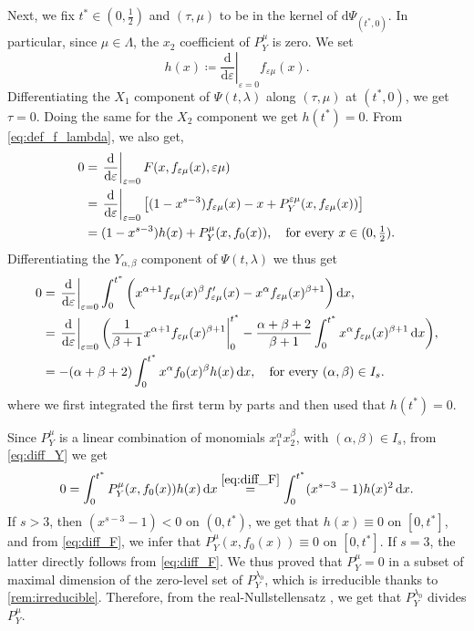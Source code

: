 \documentclass[a4paper,11pt,reqno]{amsart}
\theoremstyle{plain}
\theoremstyle{definition}
\newcommand{\de}{\mathrm{d}}
\begin{document}
Next, we fix $t^* \in (0,\tfrac{1}{2})$ and $(\tau,\mu)$ to be in the kernel of $\de\Psi_{(t^*,0)}$. In particular, since $\mu \in \Lambda$, the $x_2$ coefficient of $P^\mu_Y$ is zero. We set
\begin{equation*}
    h(x) \coloneq  \left.\frac{\de}{\de\varepsilon}\right|_{\varepsilon=0}
 f_{\varepsilon \mu}(x).
\end{equation*}
Differentiating the $X_1$ component of $\Psi(t,\lambda)$ along $(\tau,\mu)$ at $(t^*,0)$, we get $\tau=0$. Doing the same for the $X_2$ component we get $h(t^*)=0$. From \eqref{eq:def_f_lambda}, we also get,
\begin{align}
    0 &= \left.\frac{\de}{\de\varepsilon}\right|_{\varepsilon=0} F(x,f_{\varepsilon\mu}(x),\varepsilon\mu) \notag \\ 
    &= \left.\frac{\de}{\de\varepsilon}\right|_{\varepsilon=0} \left[(1-x^{s-3})f_{\varepsilon\mu}(x) -x + P^{\varepsilon\mu}_Y(x,f_{\varepsilon\mu}(x))\right] \notag \\ 
    &= (1-x^{s-3})h(x) + P^\mu_Y(x,f_0(x)), \quad \text{for every $x \in (0,\tfrac{1}{2})$.}\label{eq:diff_F}
\end{align}
Differentiating the $Y_{\alpha,\beta}$ component of $\Psi(t,\lambda)$ we thus get
\begin{align}
    0 &= \left.\frac{\de}{\de\varepsilon}\right|_{\varepsilon=0} \int^{t^*}_0 \bigg(x^{\alpha+1}f_{\varepsilon\mu}(x)^\beta f_{\varepsilon\mu}'(x) - x^\alpha f_{\varepsilon\mu}(x)^{\beta+1}\bigg)\, \de x, \notag \\
    &= \left.\frac{\de}{\de\varepsilon}\right|_{\varepsilon=0} \bigg(\frac{1}{\beta+1} x^{\alpha+1}f_{\varepsilon\mu}(x)^{\beta +1}\bigg|^{t^*}_0 - \frac{\alpha+\beta+2}{\beta+1} \int^{t^*}_0 x^\alpha f_{\varepsilon\mu}(x)^{\beta+1}\, \de x \bigg), \notag \\
    &= -(\alpha+\beta+2)\int^{t^*}_0 x^\alpha f_0(x)^{\beta}h(x)\, \de x, \quad \text{for every $(\alpha,\beta) \in I_s$.} \label{eq:diff_Y}
\end{align}
where we first integrated the first term by parts and then used that $h(t^*)=0$.

Since $P^\mu_Y$ is a linear combination of monomials $x_1^\alpha x_2^\beta$, with $(\alpha,\beta) \in I_s$, from \eqref{eq:diff_Y} we get
\begin{equation*}
    0 = \int^{t^*}_0 P^\mu_Y(x,f_0(x))h(x) \, \de x \stackrel{\eqref{eq:diff_F}}{=} \int^{t^*}_0 (x^{s-3}-1)h(x)^2 \, \de x.
\end{equation*}
 If $s>3$, then $(x^{s-3}-1) < 0$ on $(0,t^*)$, we get that $h(x) \equiv 0$ on $[0,t^*]$, and from \eqref{eq:diff_F}, we infer that $P^\mu_Y(x,f_0(x)) \equiv 0$ on $ [0,t^*]$. If $s=3$, the latter directly follows from \eqref{eq:diff_F}. We thus proved that $P^\mu_Y=0$ in a subset of maximal dimension of the zero-level set of $P^{\lambda_0}_Y$, which is irreducible thanks to  \cref{rem:irreducible}. Therefore, from the real-Nullstellensatz \cite[Theorem~4.5.1]{MR1659509}, we get that $P^{\lambda_0}_Y$ divides $P^\mu_Y$.
\end{document}
